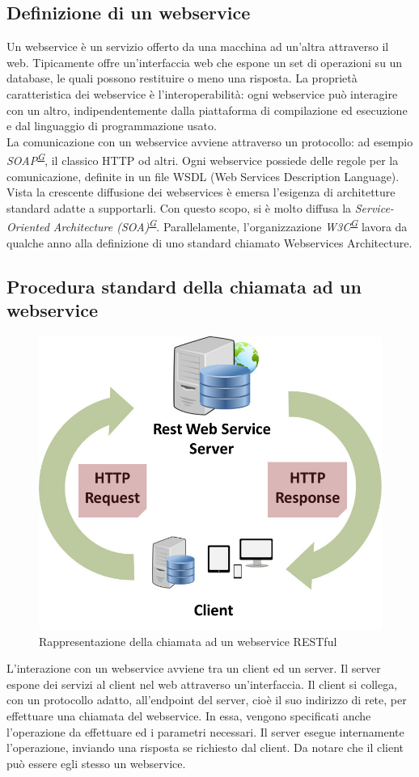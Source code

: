 \documentclass[a4paper]{article}
\begin{document}
\subsection{Definizione di un webservice}
Un webservice è un servizio offerto da una macchina ad un'altra attraverso il web. Tipicamente offre un'interfaccia web che espone un set di operazioni su un database, le quali possono restituire o meno una risposta. La proprietà caratteristica dei webservice è l'interoperabilità: ogni webservice può interagire con un altro, indipendentemente dalla piattaforma di compilazione ed esecuzione e dal linguaggio di programmazione usato.
\\
La comunicazione con un webservice avviene attraverso un protocollo: ad esempio \textit{SOAP\textsuperscript{\hyperref[sec:gl]{G}}}, il classico HTTP od altri. Ogni webservice possiede delle regole per la comunicazione, definite in un file WSDL (Web Services Description Language). Vista la crescente diffusione dei webservices è emersa l'esigenza di architetture standard adatte a supportarli. Con questo scopo, si è molto diffusa la \textit{Service-Oriented Architecture (SOA)\textsuperscript{\hyperref[sec:gl]{G}}}. Parallelamente, l'organizzazione \textit{W3C\textsuperscript{\hyperref[sec:gl]{G}}} lavora da qualche anno alla definizione di uno standard chiamato Webservices Architecture.

\subsection{Procedura standard della chiamata ad un webservice}
\begin{figure}[H]
	\centering
	\includegraphics[width=0.4\linewidth]{images/webservice.jpg}
    \caption{Rappresentazione della chiamata ad un webservice RESTful}
\end{figure}
L'interazione con un webservice avviene tra un client ed un server. Il server espone dei servizi al client nel web attraverso un'interfaccia. Il client si collega, con un protocollo adatto, all'endpoint del server, cioè il suo indirizzo di rete, per effettuare una chiamata del webservice. In essa, vengono specificati anche l'operazione da effettuare ed i parametri necessari. Il server esegue internamente l'operazione, inviando una risposta se richiesto dal client. Da notare che il client può essere egli stesso un webservice.
\end{document}
